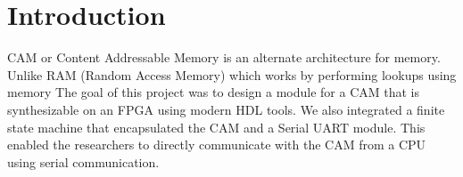 \section{Introduction}
CAM or Content Addressable Memory is an alternate architecture for memory. Unlike RAM (Random Access Memory) which works by performing lookups using memory 
The goal of this project was to design a module for a CAM that is synthesizable on an FPGA using modern HDL tools. 
We also integrated a finite state machine that encapsulated the CAM and a Serial UART module. 
This enabled the researchers to directly communicate with the CAM from a CPU using serial communication. 
